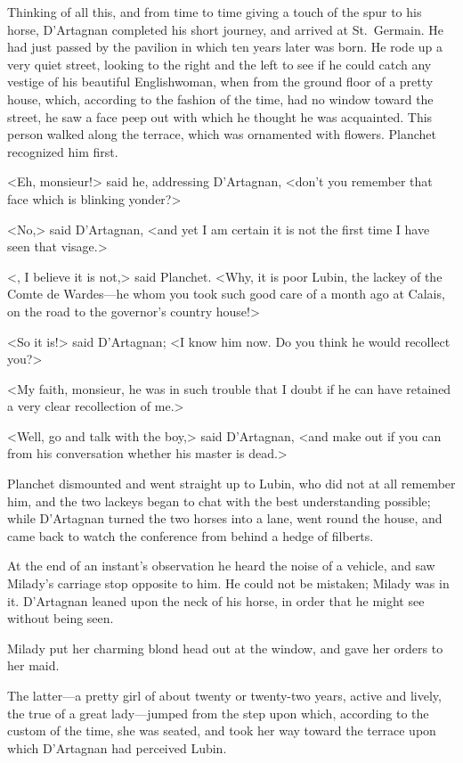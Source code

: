 Thinking of all this, and from time to time giving a touch of the spur to his horse, D'Artagnan completed his short journey, and arrived at St.~Germain. He had just passed by the pavilion in which ten years later  was born. He rode up a very quiet street, looking to the right and the left to see if he could catch any vestige of his beautiful Englishwoman, when from the ground floor of a pretty house, which, according to the fashion of the time, had no window toward the street, he saw a face peep out with which he thought he was acquainted. This person walked along the terrace, which was ornamented with flowers. Planchet recognized him first. 

<Eh, monsieur!> said he, addressing D'Artagnan, <don't you remember that face which is blinking yonder?> 

<No,> said D'Artagnan, <and yet I am certain it is not the first time I have seen that visage.> 

<, I believe it is not,> said Planchet. <Why, it is poor Lubin, the lackey of the Comte de Wardes—he whom you took such good care of a month ago at Calais, on the road to the governor's country house!> 

<So it is!> said D'Artagnan; <I know him now. Do you think he would recollect you?> 

<My faith, monsieur, he was in such trouble that I doubt if he can have retained a very clear recollection of me.> 

<Well, go and talk with the boy,> said D'Artagnan, <and make out if you can from his conversation whether his master is dead.> 

Planchet dismounted and went straight up to Lubin, who did not at all remember him, and the two lackeys began to chat with the best understanding possible; while D'Artagnan turned the two horses into a lane, went round the house, and came back to watch the conference from behind a hedge of filberts. 

At the end of an instant's observation he heard the noise of a vehicle, and saw Milady's carriage stop opposite to him. He could not be mistaken; Milady was in it. D'Artagnan leaned upon the neck of his horse, in order that he might see without being seen. 

Milady put her charming blond head out at the window, and gave her orders to her maid. 

The latter—a pretty girl of about twenty or twenty-two years, active and lively, the true  of a great lady—jumped from the step upon which, according to the custom of the time, she was seated, and took her way toward the terrace upon which D'Artagnan had perceived Lubin. 

